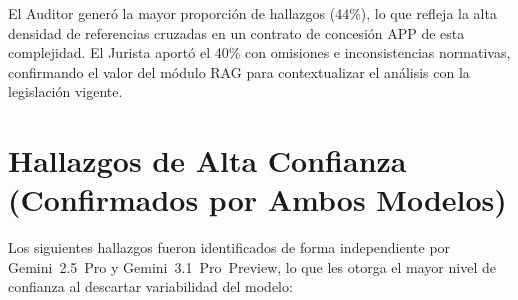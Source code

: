 El Auditor generó la mayor proporción de hallazgos (44\%), lo que refleja
la alta densidad de referencias cruzadas en un contrato de concesión APP de
esta complejidad. El Jurista aportó el 40\% con omisiones e inconsistencias
normativas, confirmando el valor del módulo RAG para contextualizar el
análisis con la legislación vigente.

\section*{Hallazgos de Alta Confianza (Confirmados por Ambos Modelos)}

Los siguientes hallazgos fueron identificados de forma independiente por
Gemini~2.5~Pro y Gemini~3.1~Pro~Preview, lo que les otorga el mayor nivel
de confianza al descartar variabilidad del modelo:

